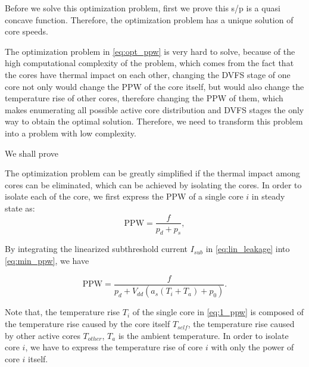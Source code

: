 Before we solve this optimization problem, first we prove this s/p is a quasi concave function. Therefore, the optimization problem has a unique solution of core speeds.

The optimization problem in \eqref{eq:opt_ppw} is very hard to solve, because of the high computational complexity of the problem, which comes from the fact that the cores have thermal impact on each other, changing the DVFS stage of one core not only would change the PPW of the core itself, but would also change the temperature rise of other cores, therefore changing the PPW of them, which makes enumerating all possible active core distribution and DVFS stages the only way to obtain the optimal solution. Therefore, we need to transform this problem into a problem with low complexity.

We shall prove 


The optimization problem can be greatly simplified if the thermal impact among cores can be eliminated, which can be achieved by isolating the cores. In order to isolate each of the core, we first express the PPW of a single core $i$ in steady state as:
\begin{equation}\label{eq:min_ppw}
\text{PPW}=\frac{f}{p_{d}+p_{s}},
\end{equation}

By integrating the linearized subthreshold current $I_{sub}$ in \eqref{eq:lin_leakage} into \eqref{eq:min_ppw}, we have

\begin{equation}\label{eq:1_ppw}
\text{PPW} = \frac{f}{p_{d}+V_{dd}(a_{s}(T_{i}+T_{a})+p_{0})}.
\end{equation}

Note that, the temperature rise $T_{i}$ of the single core in \eqref{eq:1_ppw} is composed of the temperature rise caused by the core itself $T_{self}$, the temperature rise caused by other active cores $T_{other}$, $T_{a}$ is the ambient temperature. 
In order to isolate core $i$, we have to express the temperature rise of core $i$ with only the power of core $i$ itself.

